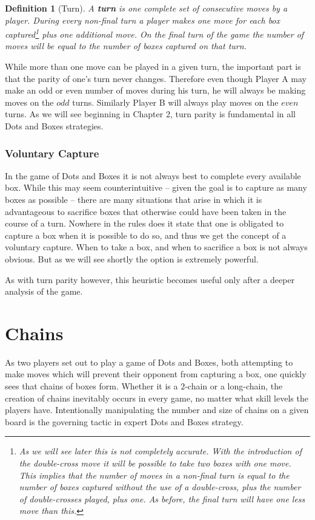 \documentclass[12pt,twoside]{reedthesis}
\newtheorem{mydef}{Definition}
\begin{document}
\begin{mydef}[Turn]
A \textbf{turn} is one complete set of consecutive moves by a player.  During every non-final turn a player makes one move for each box captured\footnote[2]{As we will see later this is not completely accurate.  With the introduction of the double-cross move it will be possible to take two boxes with one move.  This implies that the number of moves in a non-final turn is equal to the number of boxes captured without the use of a double-cross, plus the number of double-crosses played, plus one. As before, the final turn will have one less move than this.} plus one additional move.  On the final turn of the game the number of moves will be equal to the number of boxes captured on that turn.
\end{mydef}

\noindent
While more than one move can be played in a given turn, the important part is that the parity of one's turn never changes.  Therefore even though Player A may make an odd or even number of moves during his turn, he will always be making moves on the $odd$ turns.  Similarly Player B will always play moves on the $even$ turns.  As we will see beginning in Chapter 2, turn parity is fundamental in all Dots and Boxes strategies.


\subsubsection{Voluntary Capture}
In the game of Dots and Boxes it is not always best to complete every available box.  While this may seem counterintuitive -- given the goal is to capture as many boxes as possible -- there are many situations that arise in which it is advantageous to sacrifice boxes that otherwise could have been taken in the course of a turn.  Nowhere in the rules does it state that one is obligated to capture a box when it is possible to do so, and thus we get the concept of a voluntary capture.  When to take a box, and when to sacrifice a box is not always obvious.  But as we will see shortly the option is extremely powerful.

As with turn parity however, this heuristic becomes useful only after a deeper analysis of the game.


\section{Chains}
As two players set out to play a game of Dots and Boxes, both attempting to make moves which will prevent their opponent from capturing a box, one quickly sees that chains of boxes form.  Whether it is a $2$-chain or a long-chain, the creation of chains inevitably occurs in every game, no matter what skill levels the players have.  Intentionally manipulating the number and size of chains on a given board is the governing tactic in expert Dots and Boxes strategy.
\end{document}
